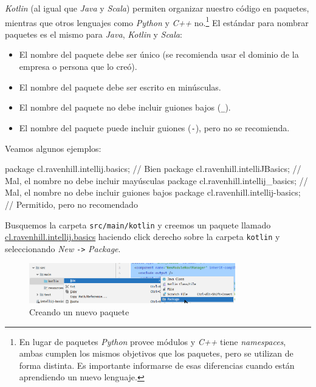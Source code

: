     \textit{Kotlin} (al igual que \textit{Java} y \textit{Scala}) permiten organizar nuestro código 
    en paquetes, mientras que otros lenguajes como \textit{Python} y \textit{C++} 
    no.\footnote{En lugar de paquetes \textit{Python} provee módulos y \textit{C++} tiene 
    \textit{namespaces}, ambas cumplen los mismos objetivos que los paquetes, pero se utilizan de 
    forma distinta. 
    Es importante informarse de esas diferencias cuando están aprendiendo un nuevo lenguaje.}
    El estándar para nombrar paquetes es el mismo para \textit{Java}, \textit{Kotlin} y 
    \textit{Scala}: 
    \begin{itemize}
      \item El nombre del paquete debe ser único (se recomienda usar el dominio de la empresa o 
        persona que lo creó).
      \item El nombre del paquete debe ser escrito en minúsculas.
      \item El nombre del paquete no debe incluir guiones bajos (\texttt{\_}).
      \item El nombre del paquete puede incluir guiones (\texttt{-}), pero no se recomienda.
    \end{itemize}

    Veamos algunos ejemplos:
    
    \begin{kotlin}
      package cl.ravenhill.intellij.basics; // Bien
      package cl.ravenhill.intelliJBasics; // Mal, el nombre no debe incluir mayúsculas
      package cl.ravenhill.intellij_basics; // Mal, el nombre no debe incluir guiones bajos
      package cl.ravenhill.intellij-basics; // Permitido, pero no recomendado
    \end{kotlin}

    Busquemos la carpeta \texttt{src/main/kotlin} y creemos un paquete llamado 
    \url{cl.ravenhill.intellij.basics} haciendo click derecho sobre la carpeta \texttt{kotlin} y 
    seleccionando \textit{New} \texttt{->} \textit{Package}.

    \begin{figure}[ht!]
      \centering
      \includegraphics[width=0.8\textwidth]{img/Por_algo_se_empieza/idea64_new_package.png}
      \caption{Creando un nuevo paquete}
      \label{fig:idea64_new_package}
    \end{figure}

